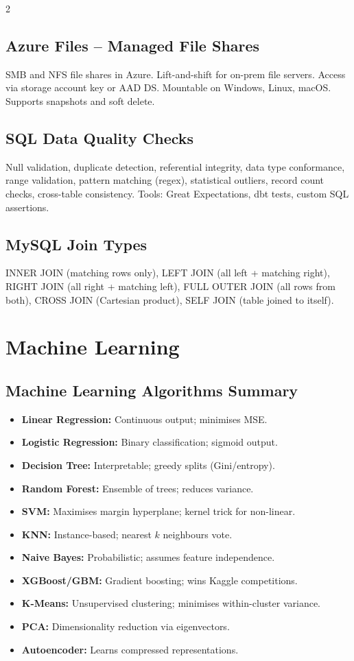 \documentclass[10pt,a4paper]{article}
\begin{document}
\begin{multicols}{2}
\subsection{Azure Files -- Managed File Shares}
SMB and NFS file shares in Azure. Lift-and-shift for on-prem file servers. Access via storage account key or AAD DS. Mountable on Windows, Linux, macOS. Supports snapshots and soft delete.

\subsection{SQL Data Quality Checks}
Null validation, duplicate detection, referential integrity, data type conformance, range validation, pattern matching (regex), statistical outliers, record count checks, cross-table consistency. Tools: Great Expectations, dbt tests, custom SQL assertions.

\subsection{MySQL Join Types}
INNER JOIN (matching rows only), LEFT JOIN (all left + matching right), RIGHT JOIN (all right + matching left), FULL OUTER JOIN (all rows from both), CROSS JOIN (Cartesian product), SELF JOIN (table joined to itself).

\section{Machine Learning}

\subsection{Machine Learning Algorithms Summary}
\begin{itemize}
\item \textbf{Linear Regression:} Continuous output; minimises MSE.
\item \textbf{Logistic Regression:} Binary classification; sigmoid output.
\item \textbf{Decision Tree:} Interpretable; greedy splits (Gini/entropy).
\item \textbf{Random Forest:} Ensemble of trees; reduces variance.
\item \textbf{SVM:} Maximises margin hyperplane; kernel trick for non-linear.
\item \textbf{KNN:} Instance-based; nearest $k$ neighbours vote.
\item \textbf{Naive Bayes:} Probabilistic; assumes feature independence.
\item \textbf{XGBoost/GBM:} Gradient boosting; wins Kaggle competitions.
\item \textbf{K-Means:} Unsupervised clustering; minimises within-cluster variance.
\item \textbf{PCA:} Dimensionality reduction via eigenvectors.
\item \textbf{Autoencoder:} Learns compressed representations.
\end{itemize}


\end{multicols}
\end{document}
